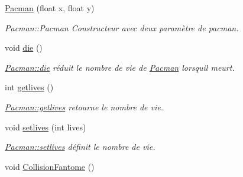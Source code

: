 \begin{DoxyCompactItemize}
\item 
\hyperlink{class_pacman_a9c539a93927d7180f6f9bb42e984bddd}{Pacman} (float x, float y)
\begin{DoxyCompactList}\small\item\em Pacman\+::\+Pacman Constructeur avec deux paramètre de pacman. \end{DoxyCompactList}\item 
\hypertarget{class_pacman_a880f3f899b2f2d1ee9969fa049f7289d}{}void \hyperlink{class_pacman_a880f3f899b2f2d1ee9969fa049f7289d}{die} ()\label{class_pacman_a880f3f899b2f2d1ee9969fa049f7289d}

\begin{DoxyCompactList}\small\item\em \hyperlink{class_pacman_a880f3f899b2f2d1ee9969fa049f7289d}{Pacman\+::die} réduit le nombre de vie de \hyperlink{class_pacman}{Pacman} lorsqu\textquotesingle{}il meurt. \end{DoxyCompactList}\item 
int \hyperlink{class_pacman_a9866de257a7fc67f56fee117ecff3060}{getlives} ()
\begin{DoxyCompactList}\small\item\em \hyperlink{class_pacman_a9866de257a7fc67f56fee117ecff3060}{Pacman\+::getlives} retourne le nombre de vie. \end{DoxyCompactList}\item 
void \hyperlink{class_pacman_ac2b56b7581f999fb374ef04f8d8ac9a4}{setlives} (int lives)
\begin{DoxyCompactList}\small\item\em \hyperlink{class_pacman_ac2b56b7581f999fb374ef04f8d8ac9a4}{Pacman\+::setlives} définit le nombre de vie. \end{DoxyCompactList}\item 
\hypertarget{class_pacman_a5945a47618f294f298dfda06c4ef1094}{}void \hyperlink{class_pacman_a5945a47618f294f298dfda06c4ef1094}{Collision\+Fantome} ()\label{class_pacman_a5945a47618f294f298dfda06c4ef1094}


\end{DoxyCompactItemize}
